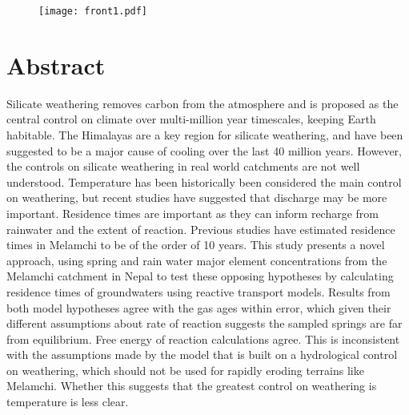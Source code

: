 \documentclass[hidelinks, 12pt]{article} %
\title{
  \vspace{-1cm}
  {\fontsize{16pt}{18pt}\selectfont
    \textbf{
      \strut Ground Truthing Earth's Silicate Weathering Thermostat:\\[0.4em] %
      \strut Using the Geochemistry of Himalayan Groundwaters to \\[-0.2em]
      \strut Calculate Residence Times
    }
  }
  \vspace{0.5cm}
}
\author{Giovanni Bernardi\\ 
Part III Project}
\date{2024-2025}
\begin{document}

\maketitle

\begingroup
\renewcommand{\thefigure}{} %
\begin{figure}[h]
  \centering
      \texttt{[image: front1.pdf]}
\end{figure}
\endgroup


\thispagestyle{empty}

\newpage

\section*{Abstract}
\label{sec:abstract}


Silicate weathering removes carbon from the atmosphere and is proposed as the central control on climate over multi-million year timescales, keeping Earth habitable. The Himalayas are a key region for silicate weathering, and have been suggested to be a major cause of cooling over the last 40 million years. However, the controls on silicate weathering in real world catchments are not well understood. Temperature has been historically been considered the main control on weathering, but recent studies have suggested that discharge may be more important. Residence times are important as they can inform recharge from rainwater and the extent of reaction. Previous studies have estimated residence times in Melamchi to be of the order of 10 years. This study presents a novel approach, using spring and rain water major element concentrations from the Melamchi catchment in Nepal to test these opposing hypotheses by calculating residence times of groundwaters using reactive transport models. Results from both model hypotheses agree with the gas ages within error, which given their different assumptions about rate of reaction suggests the sampled springs are far from equilibrium. Free energy of reaction calculations agree. This is inconsistent with the assumptions made by the model that is built on a hydrological control on weathering, which should not be used for rapidly eroding terrains like Melamchi. Whether this suggests that the greatest control on weathering is temperature is less clear.



\end{document}
